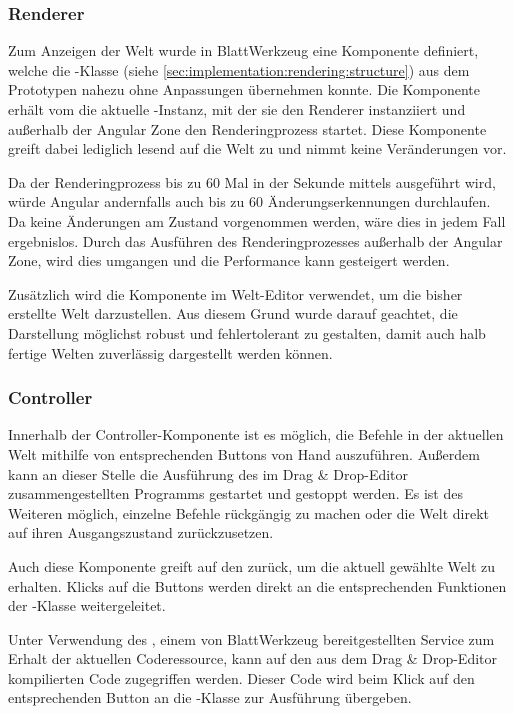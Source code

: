 \subsubsection{Renderer}
\label{sec:implementation:integration:renderer}

Zum Anzeigen der Welt wurde in BlattWerkzeug eine Komponente definiert, welche die -Klasse (siehe \ref{sec:implementation:rendering:structure}) aus dem Prototypen nahezu ohne Anpassungen übernehmen konnte. Die Komponente erhält vom  die aktuelle -Instanz, mit der sie den Renderer instanziiert und außerhalb der Angular Zone den Renderingprozess startet. Diese Komponente greift dabei lediglich lesend auf die Welt zu und nimmt keine Veränderungen vor.

Da der Renderingprozess bis zu 60 Mal in der Sekunde mittels  ausgeführt wird, würde Angular andernfalls auch bis zu 60 Änderungserkennungen durchlaufen. Da keine Änderungen am Zustand vorgenommen werden, wäre dies in jedem Fall ergebnislos. Durch das Ausführen des Renderingprozesses außerhalb der Angular Zone, wird dies umgangen und die Performance kann gesteigert werden.

Zusätzlich wird die Komponente im Welt-Editor verwendet, um die bisher erstellte Welt darzustellen. Aus diesem Grund wurde darauf geachtet, die Darstellung möglichst robust und fehlertolerant zu gestalten, damit auch halb fertige Welten zuverlässig dargestellt werden können.

\subsubsection{Controller}
\label{sec:implementation:integration:controller}

Innerhalb der Controller-Komponente ist es möglich, die Befehle in der aktuellen Welt mithilfe von entsprechenden Buttons von Hand auszuführen. Außerdem kann an dieser Stelle die Ausführung des im Drag \& Drop-Editor zusammengestellten Programms gestartet und gestoppt werden. Es ist des Weiteren möglich, einzelne Befehle rückgängig zu machen oder die Welt direkt auf ihren Ausgangszustand zurückzusetzen.

Auch diese Komponente greift auf den  zurück, um die aktuell gewählte Welt zu erhalten. Klicks auf die Buttons werden direkt an die entsprechenden Funktionen der -Klasse weitergeleitet.

Unter Verwendung des , einem von BlattWerkzeug bereitgestellten Service zum Erhalt der aktuellen Coderessource, kann auf den aus dem Drag \& Drop-Editor kompilierten Code zugegriffen werden. Dieser Code wird beim Klick auf den entsprechenden Button an die -Klasse zur Ausführung übergeben.


